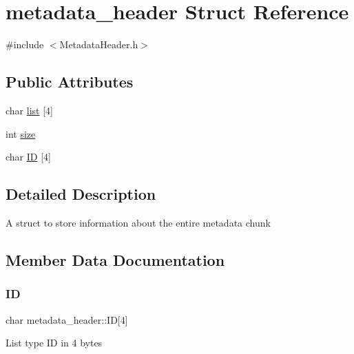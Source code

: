 \hypertarget{structmetadata__header}{}\section{metadata\+\_\+header Struct Reference}
\label{structmetadata__header}


{\ttfamily \#include $<$Metadata\+Header.\+h$>$}

\subsection*{Public Attributes}
\begin{DoxyCompactItemize}
\item 
char \hyperlink{structmetadata__header_a9e7cb32f200974902755377832b9e209}{list} \mbox{[}4\mbox{]}
\item 
int \hyperlink{structmetadata__header_a225077991d32dcc769f7dcb9185c4025}{size}
\item 
char \hyperlink{structmetadata__header_a91aebd4892930be5b5aa061928a81d7e}{ID} \mbox{[}4\mbox{]}
\end{DoxyCompactItemize}


\subsection{Detailed Description}
A struct to store information about the entire metadata chunk 

\subsection{Member Data Documentation}
\mbox{\label{structmetadata__header_a91aebd4892930be5b5aa061928a81d7e}} 
\subsubsection{\texorpdfstring{ID}{ID}}
{\footnotesize\ttfamily char metadata\+\_\+header\+::\+ID\mbox{[}4\mbox{]}}

List type ID in 4 bytes \mbox{\label{structmetadata__header_a9e7cb32f200974902755377832b9e209}} 
